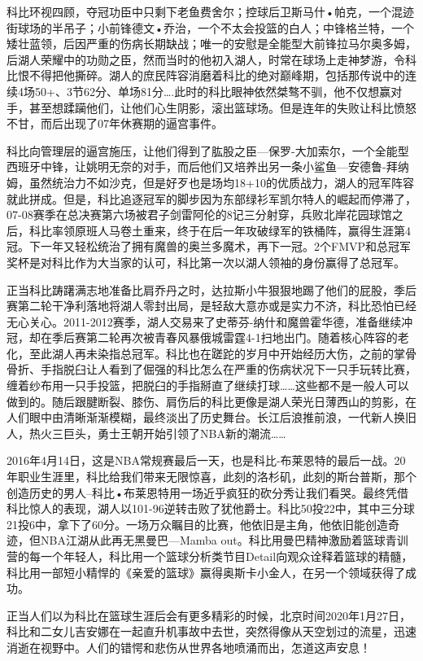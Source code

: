 \documentclass[
]{book}
\begin{document}
科比环视四顾，夺冠功臣中只剩下老鱼费舍尔；控球后卫斯马什•帕克，一个混迹街球场的半吊子；小前锋德文•乔治，一个不太会投篮的白人；中锋格兰特，一个矮壮蓝领，后因严重的伤病长期缺战；唯一的安慰是全能型大前锋拉马尔奥多姆，后湖人荣耀中的功勋之臣，然而当时的他初入湖人，时常在球场上走神梦游，令科比恨不得把他撕碎。湖人的庶民阵容消磨着科比的绝对巅峰期，包括那传说中的连续4场50+、3节62分、单场81分\ldots.此时的科比眼神依然桀骜不驯，他不仅想赢对手，甚至想蹂躏他们，让他们心生阴影，滚出篮球场。但是连年的失败让科比愤怒不甘，而后出现了07年休赛期的逼宫事件。

科比向管理层的逼宫施压，让他们得到了肱股之臣---保罗-大加索尔，一个全能型西班牙中锋，让姚明无奈的对手，而后他们又培养出另一条小鲨鱼---安德鲁-拜纳姆，虽然统治力不如沙克，但是好歹也是场均18+10的优质战力，湖人的冠军阵容就此拼成。但是，科比追逐冠军的脚步因为东部绿衫军凯尔特人的崛起而停滞了，07-08赛季在总决赛第六场被君子剑雷阿伦的8记三分射穿，兵败北岸花园球馆之后，科比率领原班人马卷土重来，终于在后一年攻破绿军的铁桶阵，赢得生涯第4冠。下一年又轻松统治了拥有魔兽的奥兰多魔术，再下一冠。2个FMVP和总冠军奖杯是对科比作为大当家的认可，科比第一次以湖人领袖的身份赢得了总冠军。

正当科比踌躇满志地准备比肩乔丹之时，达拉斯小牛狠狠地踢了他们的屁股，季后赛第二轮干净利落地将湖人零封出局，是轻敌大意亦或是实力不济，科比恐怕已经无心关心。2011-2012赛季，湖人交易来了史蒂芬-纳什和魔兽霍华德，准备继续冲冠，却在季后赛第二轮再次被青春风暴俄城雷霆4-1扫地出门。随着核心阵容的老化，至此湖人再未染指总冠军。科比也在蹉跎的岁月中开始经历大伤，之前的掌骨骨折、手指脱臼让人看到了倔强的科比怎么在严重的伤病状况下一只手玩转比赛，缠着纱布用一只手投篮，把脱臼的手指掰直了继续打球\ldots\ldots 这些都不是一般人可以做到的。随后跟腱断裂、膝伤、肩伤后的科比更像是湖人荣光日薄西山的剪影，在人们眼中由清晰渐渐模糊，最终淡出了历史舞台。长江后浪推前浪，一代新人换旧人，热火三巨头，勇士王朝开始引领了NBA新的潮流\ldots\ldots{}

2016年4月14日，这是NBA常规赛最后一天，也是科比-布莱恩特的最后一战。20年职业生涯里，科比给我们带来无限惊喜，此刻的洛杉矶，此刻的斯台普斯，那个创造历史的男人--科比•布莱恩特用一场近乎疯狂的砍分秀让我们看哭。最终凭借科比惊人的表现，湖人以101-96逆转击败了犹他爵士。科比50投22中，其中三分球21投6中，拿下了60分。一场万众瞩目的比赛，他依旧是主角，他依旧能创造奇迹，但NBA江湖从此再无黑曼巴---Mamba out。科比用曼巴精神激励着篮球青训营的每一个年轻人，科比用一个篮球分析类节目Detail向观众诠释着篮球的精髓，科比用一部短小精悍的《亲爱的篮球》赢得奥斯卡小金人，在另一个领域获得了成功。

正当人们以为科比在篮球生涯后会有更多精彩的时候，北京时间2020年1月27日，科比和二女儿吉安娜在一起直升机事故中去世，突然得像从天空划过的流星，迅速消逝在视野中。人们的错愕和悲伤从世界各地喷涌而出，怎道这声安息！
\end{document}

